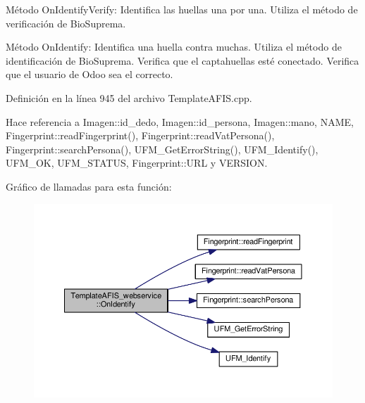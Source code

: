 Método On\+Identify\+Verify\+: Identifica las huellas una por una. Utiliza el método de verificación de Bio\+Suprema.

Método On\+Identify\+: Identifica una huella contra muchas. Utiliza el método de identificación de Bio\+Suprema. Verifica que el captahuellas esté conectado. Verifica que el usuario de Odoo sea el correcto. 

Definición en la línea 945 del archivo Template\+A\+F\+I\+S.\+cpp.



Hace referencia a Imagen\+::id\+\_\+dedo, Imagen\+::id\+\_\+persona, Imagen\+::mano, N\+A\+ME, Fingerprint\+::read\+Fingerprint(), Fingerprint\+::read\+Vat\+Persona(), Fingerprint\+::search\+Persona(), U\+F\+M\+\_\+\+Get\+Error\+String(), U\+F\+M\+\_\+\+Identify(), U\+F\+M\+\_\+\+OK, U\+F\+M\+\_\+\+S\+T\+A\+T\+US, Fingerprint\+::\+U\+RL y V\+E\+R\+S\+I\+ON.

Gráfico de llamadas para esta función\+:\nopagebreak
\begin{figure}[H]
\begin{center}
\leavevmode
\includegraphics[width=350pt]{classTemplateAFIS__webservice_ab66286f0a3f0702977a46332d3bce05d_cgraph}
\end{center}
\end{figure}
\hypertarget{classTemplateAFIS__webservice_a2c62949a4ec904bfc4571d95d577ddb4}{}\label{classTemplateAFIS__webservice_a2c62949a4ec904bfc4571d95d577ddb4} 
